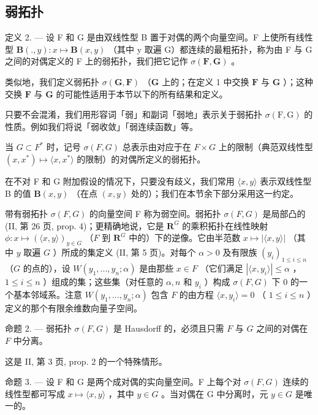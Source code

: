 \subsection{弱拓扑}

定义 2. --- 设 F 和 G 是由双线性型 B 置于对偶的两个向量空间。F 上使所有线性型 \(\mathbf{B}(., y): x \mapsto \mathbf{B}(x, y)\) （其中 y 取遍 G）都连续的最粗拓扑，称为由 F 与 G 之间的对偶定义的 F 上的弱拓扑，我们把它记作 \(\sigma(\mathbf{F}, \mathbf{G})\) 。

类似地，我们定义弱拓扑 \(\sigma(\mathbf{G},\mathbf{F})\) （\(\mathbf{G}\) 上的；在定义 1 中交换 \(\mathbf{F}\) 与 \(\mathbf{G}\) ）；这种交换 \(\mathbf{F}\) 与 \(\mathbf{G}\) 的可能性适用于本节以下的所有结果和定义。

只要不会混淆，我们用形容词「弱」和副词「弱地」表示关于弱拓扑 \(\sigma(\mathrm{F},\mathrm{G})\) 的性质。例如我们将说「弱收敛」「弱连续函数」等。

当 \(G \subset F^{*}\) 时，记号 \(\sigma(F, G)\) 总表示由对应于在 \(F \times G\) 上的限制（典范双线性型 \((x, x^{*}) \mapsto \langle x, x^{*} \rangle\) 的限制）的对偶所定义的弱拓扑。

在不对 F 和 G 附加假设的情况下，只要没有歧义，我们常用 \(\langle x, y \rangle\) 表示双线性型 B 的值 \(\mathbf{B}(x, y)\) （在点 \((x, y)\) 处的）；我们在本节余下部分采用这一约定。

带有弱拓扑 \(\sigma(F, G)\) 的向量空间 F 称为弱空间。弱拓扑 \(\sigma(F, G)\) 是局部凸的 (II, 第 26 页, prop. 4)；更精确地说，它是 \(\mathbf{R}^G\) 的乘积拓扑在线性映射 \(\phi: x \mapsto (\langle x, y \rangle)_{y \in G}\) （\(F\) 到 \(\mathbf{R}^G\) 中的）下的逆像。它由半范数 \(x \mapsto |\langle x, y \rangle|\) （其中 \(y\) 取遍 \(G\) ）所成的集定义 (II, 第 5 页)。对每个 \(\alpha > 0\) 及有限族 \((y_i)_{1 \leq i \leq n}\) （\(G\) 的点的），设 \(W(y_1, ..., y_n; \alpha)\) 是由那些 \(x \in F\) （它们满足 \(|\langle x, y_i \rangle| \leqslant \alpha\) ，\(1 \leq i \leq n\) ）组成的集；这些集（对任意的 \(\alpha, n\) 和 \(y_i\) ）构成 \(\sigma(F, G)\) 下 0 的一个基本邻域系。注意 \(W(y_1, ..., y_n; \alpha)\) 包含 \(F\) 的由方程 \(\langle x, y_i \rangle = 0\) （ \(1 \leq i \leq n\) ）定义的那个有限余维数向量子空间。

命题 2. --- 弱拓扑 \(\sigma(F, G)\) 是 Hausdorff 的，必须且只需 \(F\) 与 \(G\) 之间的对偶在 \(F\) 中分离。

这是 II, 第 3 页, prop. 2 的一个特殊情形。

命题 3. --- 设 F 和 G 是两个成对偶的实向量空间。F 上每个对 \(\sigma(F, G)\) 连续的线性型都可写成 \(x \mapsto \langle x, y \rangle\) ，其中 \(y \in G\) 。当对偶在 G 中分离时，元 \(y \in G\) 是唯一的。

